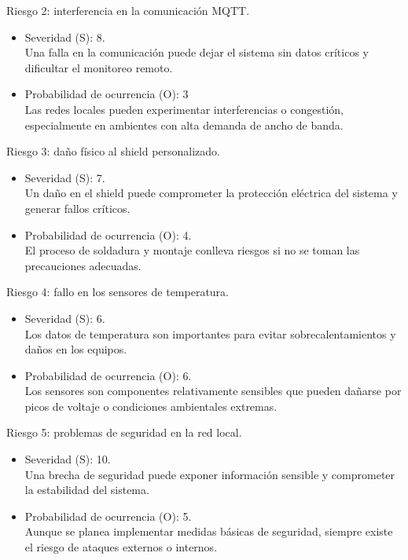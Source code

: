 \documentclass[
11pt, %
]{charter}
\begin{document}
Riesgo 2: interferencia en la comunicación MQTT.
\begin{itemize}
	\item Severidad (S): 8. \\ 
	Una falla en la comunicación puede dejar el sistema sin datos críticos y dificultar el monitoreo remoto.
	\item Probabilidad de ocurrencia (O): 3 \\
	Las redes locales pueden experimentar interferencias o congestión, especialmente en ambientes con alta demanda de ancho de banda.
\end{itemize}   

Riesgo 3: daño físico al shield personalizado.
\begin{itemize}
	\item Severidad (S): 7. \\ 
	Un daño en el shield puede comprometer la protección eléctrica del sistema y generar fallos críticos.
	\item Probabilidad de ocurrencia (O): 4. \\
	El proceso de soldadura y montaje conlleva riesgos si no se toman las precauciones adecuadas.
\end{itemize}   

Riesgo 4: fallo en los sensores de temperatura.
\begin{itemize}
	\item Severidad (S): 6. \\ 
	Los datos de temperatura son importantes para evitar sobrecalentamientos y daños en los equipos.
	\item Probabilidad de ocurrencia (O): 6. \\
	Los sensores son componentes relativamente sensibles que pueden dañarse por picos de voltaje o condiciones ambientales extremas.
\end{itemize}   

Riesgo 5: problemas de seguridad en la red local.
\begin{itemize}
	\item Severidad (S): 10. \\ 
	Una brecha de seguridad puede exponer información sensible y comprometer la estabilidad del sistema.
	\item Probabilidad de ocurrencia (O): 5. \\
	Aunque se planea implementar medidas básicas de seguridad, siempre existe el riesgo de ataques externos o internos.
\end{itemize}   
\end{document}
